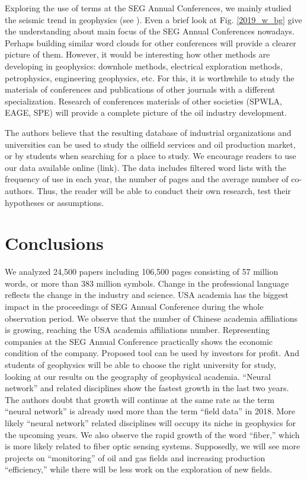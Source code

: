 \documentclass[geosciences,article,submit,moreauthors,pdftex]{Definitions/mdpi}
\begin{document}
Exploring the use of terms at the SEG Annual Conferences, we mainly studied the seismic trend in geophysics (see ). Even a brief look at Fig. \ref{2019_w_bg} give the understanding about main focus of the SEG Annual Conferences nowadays. Perhaps building similar word clouds for other conferences will provide a clearer picture of them. However, it would be interesting how other methods are developing in geophysics: downhole methods, electrical exploration methods, petrophysics, engineering geophysics, etc. For this, it is worthwhile to study the materials of conferences and publications of other journals with a different specialization. Research of conferences materials of other societies (SPWLA, EAGE, SPE) will provide a complete picture of the oil industry development.

The authors believe that the resulting database of industrial organizations and universities can be used to study the oilfield services and oil production market, or by students when searching for a place to study. We encourage readers to use our data available online (link). The data includes filtered word lists with the frequency of use in each year, the number of pages and the average number of co-authors. Thus, the reader will be able to conduct their own research, test their hypotheses or assumptions.


\section{Conclusions}

We analyzed 24,500 papers including 106,500 pages consisting of 57 million words, or more than 383 million symbols. Change in the professional language reflects the change in the industry and science.  USA academia has the biggest impact in the proceedings of SEG Annual Conference during the whole observation period. We observe that the number of Chinese academia affiliations is growing, reaching the USA academia affiliations number. Representing companies at the SEG Annual Conference practically shows the economic condition of the company. Proposed tool can be used by investors for profit. And students of geophysics will be able to choose the right university for study, looking at our results on the geography of geophysical academia. “Neural network” and related disciplines show the fastest growth in the last two years. The authors doubt that growth will continue at the same rate as the term “neural network” is already used more than the term “field data” in 2018. More likely “neural network” related disciplines will occupy its niche in geophysics for the upcoming years. We also observe the rapid growth of the word “fiber,” which is more likely related to fiber optic sensing systems. Supposedly, we will see more projects on “monitoring” of oil and gas fields and increasing production “efficiency,” while there will be less work on the exploration of new fields.
\end{document}
